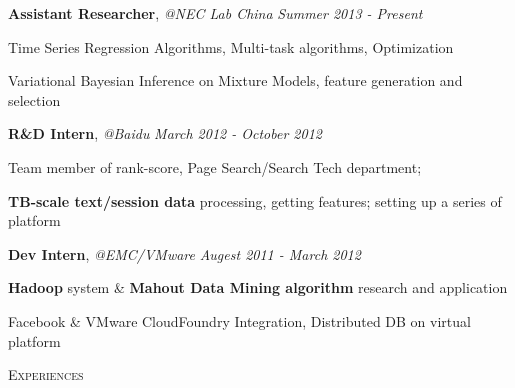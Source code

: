 \documentclass[10pt,a4paper]{article}
\newenvironment{changemargin}[2]{%
  \begin{list}{}{%
    \setlength{\topsep}{0pt}%
    \setlength{\leftmargin}{#1}%
    \setlength{\rightmargin}{#2}%
    \setlength{\listparindent}{\parindent}%
    \setlength{\itemindent}{\parindent}%
    \setlength{\parsep}{\parskip}%
  }%
  \item[]}{\end{list}
}
\newcommand{\lineover}{
	\begin{changemargin}{-0.05in}{-0.05in}
		\vspace*{-8pt}
		\hrulefill \\
		\vspace*{-2pt}
	\end{changemargin}
}
\newcommand{\header}[1]{
	\begin{changemargin}{-0.5in}{-0.5in}
		\scshape{#1}\\
  	\lineover
	\end{changemargin}
}
\newenvironment{body} {
	\vspace*{-16pt}
	\begin{changemargin}{-0.25in}{-0.5in}
  }	
	{\end{changemargin}
}
\begin{document}
\begin{body}
	\vspace{14pt}
	\textbf{Assistant Researcher}, \emph{@NEC Lab China} \hfill \emph{Summer 2013 - Present}\\
	\vspace*{-4pt}
	\begin{description} \itemsep -0pt  %
		\item Time Series Regression Algorithms, Multi-task algorithms,  Optimization
		\item Variational Bayesian Inference on Mixture Models, feature generation and selection 
	\end{description}

	\textbf {R\&D Intern}, \emph{@Baidu} \hfill \emph{March 2012 - October 2012}\\
	\vspace*{-4pt}
	\begin{description} \itemsep -0pt
		\item Team member of rank-score, Page Search/Search Tech department; 
		\item \textbf{TB-scale text/session data} processing, getting features; setting up a series of platform
	\end{description}
	
	
	\textbf {Dev Intern}, \emph{@EMC/VMware} \hfill \emph{Augest 2011 - March 2012}\\
	\vspace*{-4pt}
	\begin{description} \itemsep -0pt
	\item \textbf{Hadoop} system \& \textbf{Mahout Data Mining algorithm} research and application
	\item Facebook \& VMware CloudFoundry Integration, Distributed DB on virtual platform
	\end{description}
\end{body}

\smallskip



\header{Experiences}
\end{document}
